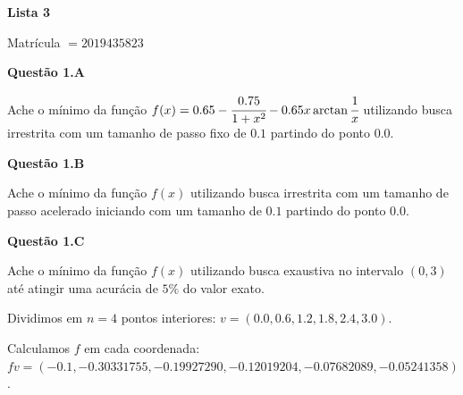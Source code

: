 \documentclass{rbfin}
\begin{document}
\rbfe{}

\begin{center}
\Large

\textbf{Lista 3}

\normalsize

Matrícula $= 2019435823$
\end{center}

\large

\textbf{Questão 1.A}

\normalsize

\vspace{6mm}

\doublespacing

Ache o mínimo da função $f(x) = 0.65 - \cfrac{0.75}{1 + x^2} - 0.65 x \arctan \cfrac{1}{x}$ utilizando busca irrestrita com um tamanho de passo fixo de $0.1$ partindo do ponto $0.0$.

\singlespacing

\vspace{6mm}

\large

\textbf{Questão 1.B}

\normalsize

\vspace{6mm}

\doublespacing

Ache o mínimo da função $f(x)$ utilizando busca irrestrita com um tamanho de passo acelerado iniciando com um tamanho de $0.1$ partindo do ponto $0.0$.

\singlespacing

\vspace{6mm}

\large

\textbf{Questão 1.C}

\normalsize

\vspace{6mm}

\doublespacing

Ache o mínimo da função $f(x)$ utilizando busca exaustiva no intervalo $(0, 3)$ até atingir uma acurácia de $5\%$ do valor exato.

Dividimos em $n = 4$ pontos interiores: $v = (0.0, 0.6, 1.2, 1.8, 2.4, 3.0)$.

Calculamos $f$ em cada coordenada: $fv = (-0.1, -0.30331755, -0.19927290, -0.12019204, -0.07682089, -0.05241358)$.
\end{document}
